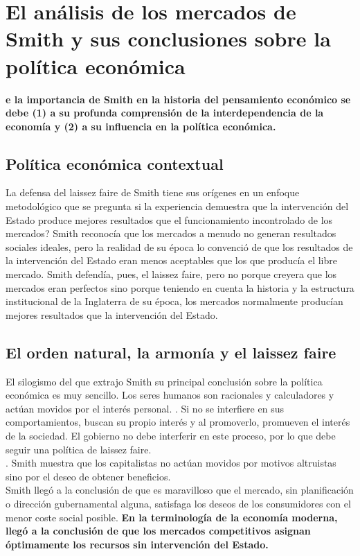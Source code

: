 \documentclass[10pt]{book}
\begin{document}
\section*{El análisis de los mercados de Smith y sus conclusiones sobre la política económica}
\textbf{e la importancia de Smith en la historia del pensamiento económico se debe (1) a su profunda comprensión de la interdependencia de la economía y (2) a su influencia en la política económica.}

\subsection*{Política económica contextual}
La defensa del laissez faire de Smith tiene sus orígenes en un enfoque metodológico que se pregunta si la experiencia demuestra que la intervención del Estado produce mejores resultados que el funcionamiento incontrolado de los mercados? Smith reconocía que los mercados a menudo no generan resultados sociales ideales, pero la realidad de su época lo convenció de que los resultados de la intervención del Estado eran menos aceptables que los que producía el libre mercado. Smith defendía, pues, el laissez faire, pero no porque creyera que los mercados eran perfectos sino porque teniendo en cuenta la historia y la estructura institucional de la Inglaterra de su época, los mercados normalmente producían mejores resultados que la intervención del Estado.\\

\subsection*{El orden natural, la armonía y el laissez faire}
El silogismo del que extrajo Smith su principal conclusión sobre la política económica es muy sencillo. Los seres humanos son racionales y calculadores y actúan movidos por el interés personal. . Si no se interfiere en sus comportamientos, buscan su propio interés y al promoverlo, promueven el interés de la sociedad. El gobierno no debe interferir en este proceso, por lo que debe seguir una política de laissez faire.\\
. Smith muestra que los capitalistas no actúan movidos por motivos altruistas sino por el deseo de obtener beneficios.\\
Smith llegó a la conclusión de que es maravilloso que el mercado, sin planificación o dirección gubernamental alguna, satisfaga los deseos de los consumidores con el menor coste social posible. \textbf{En la terminología de la economía moderna, llegó a la conclusión de que los mercados competitivos asignan óptimamente los recursos sin intervención del Estado.}
\end{document}

